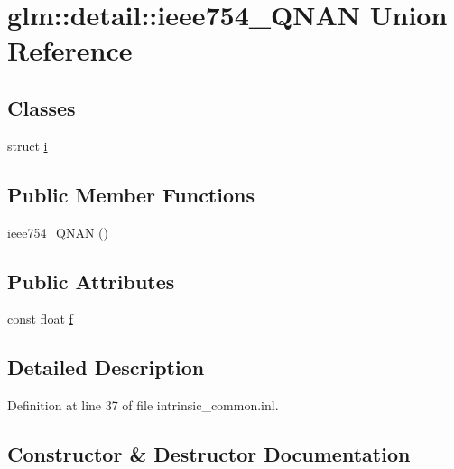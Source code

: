 \hypertarget{unionglm_1_1detail_1_1ieee754___q_n_a_n}{}\section{glm\+:\+:detail\+:\+:ieee754\+\_\+\+Q\+N\+AN Union Reference}
\label{unionglm_1_1detail_1_1ieee754___q_n_a_n}
\subsection*{Classes}
\begin{DoxyCompactItemize}
\item 
struct \hyperlink{structglm_1_1detail_1_1ieee754___q_n_a_n_1_1i}{i}
\end{DoxyCompactItemize}
\subsection*{Public Member Functions}
\begin{DoxyCompactItemize}
\item 
\hyperlink{unionglm_1_1detail_1_1ieee754___q_n_a_n_ac2fd8da4b2fe50fbbd9f32f2c60c92ec}{ieee754\+\_\+\+Q\+N\+AN} ()
\end{DoxyCompactItemize}
\subsection*{Public Attributes}
\begin{DoxyCompactItemize}
\item 
const float \hyperlink{unionglm_1_1detail_1_1ieee754___q_n_a_n_ac5f04f4e605e4d08ddc2bacddf7eee65}{f}
\end{DoxyCompactItemize}


\subsection{Detailed Description}


Definition at line 37 of file intrinsic\+\_\+common.\+inl.



\subsection{Constructor \& Destructor Documentation}
\mbox{\label{unionglm_1_1detail_1_1ieee754___q_n_a_n_ac2fd8da4b2fe50fbbd9f32f2c60c92ec}} 
